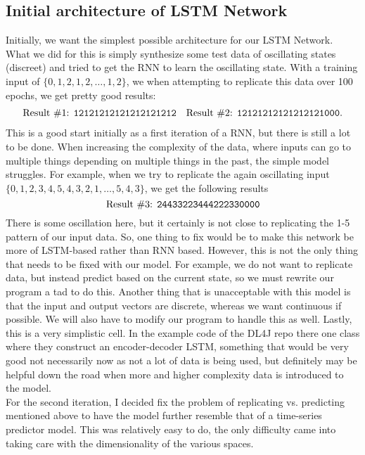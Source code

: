 \documentclass{article}
\begin{document}
\subsection*{Initial architecture of LSTM Network}
Initially, we want the simplest possible architecture for our LSTM Network. What we did for this is simply synthesize some test data of oscillating states (discreet) and tried to get the RNN to learn the oscillating state. With a training input of $\{0,1,2,1,2,\ldots,1,2\}$, we when attempting to replicate this data over 100 epochs, we get pretty good results:
\begin{align*}
\text{Result \#1: \texttt{12121212121212121212}} && \text{Result \#2: \texttt{12121212121212121000}}.
\end{align*}
This is a good start initially as a first iteration of a RNN, but there is still a lot to be done. When increasing the complexity of the data, where inputs can go to multiple things depending on multiple things in the past, the simple model struggles. For example, when we try to replicate the again oscillating input $\{0,1,2,3,4,5,4,3,2,1,\ldots,5,4,3\}$, we get the following results
$$
\text{Result \#3: \texttt{24433223444222330000}}
$$
There is some oscillation here, but it certainly is not close to replicating the 1-5 pattern of our input data. So, one thing to fix would be to make this network be more of LSTM-based rather than RNN based. However, this is not the only thing that needs to be fixed with our model. For example, we do not want to replicate data, but instead predict based on the current state, so we must rewrite our program a tad to do this. Another thing that is unacceptable with this model is that the input and output vectors are discrete, whereas we want continuous if possible. We will also have to modify our program to handle this as well. Lastly, this is a very simplistic cell. In the example code of the DL4J repo there one class where they construct an encoder-decoder LSTM, something that would be very good not necessarily now as not a lot of data is being used, but definitely may be helpful down the road when more and higher complexity data is introduced to the model. \\\newline 
For the second iteration, I decided fix the problem of replicating vs. predicting mentioned above to have the model further resemble that of a time-series predictor model. This was relatively easy to do, the only difficulty came into taking care with the dimensionality of the various spaces.
\end{document}
